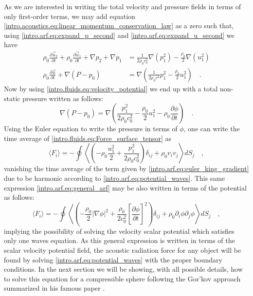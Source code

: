 As we are interested in writing the total velocity and pressure fields in terms of only first-order terms, we may add equation \ref{intro.acoustics.eq:linear_momentum_conservation_law} as a zero such that, using \ref{intro.arf.eq:expand_p_second} and \ref{intro.arf.eq:expand_u_second} we have
\begin{align}
    \rho_0\frac{\partial\vec u_2}{\partial t} + \rho_0\frac{\partial\vec u_1}{\partial t} + \nabla p_2 + \nabla p_1 &=  \frac{1}{2\rho_0 c_0^2}\nabla(p_1^2) - \frac{\rho_0}{2}\nabla(u_1^2)\nonumber\\
    \rho_0\frac{\partial\vec u}{\partial t} + \nabla (P - p_0) &= \nabla\left(\frac{1}{2\rho_0 c^2}p_1^2 - \frac{\rho_0}{2}u_1^2\right)\quad.
\end{align}
Now by using \ref{intro.fluids.eq:velocity_potential} we end up with a total non-static pressure written as follows:
\begin{equation}\label{intro.arf.eq:euler_king_gradient}
    \nabla(P - p_0) = \nabla\left(\frac{p_1^2}{2\rho_0 c_0^2} - \frac{\rho_0}{2}u_1^2 - \rho_0\frac{\partial\phi}{\partial t}\right)\quad.
\end{equation}
Using the Euler equation to write the pressure in terms of $\phi$, one can write the time average of \eqref{intro.fluids.eq:Force_surface_tensor} as
\begin{equation}\label{intro.arf.eq:general_arf}
    \langle F_{i} \rangle = - \oint \left\langle\left(-\rho_0\frac{u_1^2}{2}+\frac{p_1^2}{2\rho_0c_0^2}\right)\delta_{ij}+\rho_0 v_iv_j\right\rangle dS_j \quad,
\end{equation}
vanishing the time average of the term given by \eqref{intro.arf.eq:euler_king_gradient} due to be harmonic according to \ref{intro.arf.eq:potential_waves}. This same expression \ref{intro.arf.eq:general_arf} may be also written in terms of the potential as follows:
\begin{equation}\label{intro.arf.eq:general_arf_phi}
    \langle F_{i} \rangle = - \oint \left\langle\left(-\frac{\rho_0}{2}|\nabla\phi|^2+\frac{\rho_0}{2c_0^2}\left[\frac{\partial\phi}{\partial t}\right]^2\right)\delta_{ij}+\rho_0 \partial_i\phi\partial_j\phi\right\rangle dS_j \quad,
\end{equation}
implying the possibility of solving the velocity scalar potential which satisfies only one waves equation. As this general expression is written in terms of the scalar velocity potential field, the acoustic radiation force for any object will be found by solving \eqref{intro.arf.eq:potential_waves} with the proper boundary conditions. In the next section we will be showing, with all possible details, how to solve this equation for a compressible sphere following the Gor'kov approach summarized in his famous paper \cite{Gorkov1962}. 

